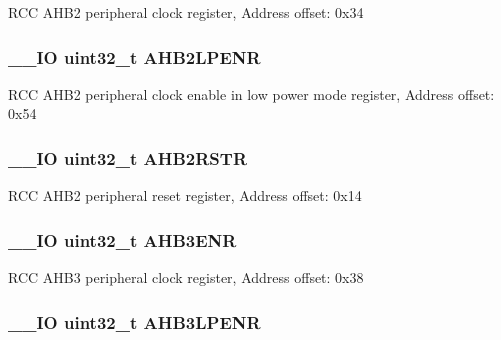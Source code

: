 R\-C\-C A\-H\-B2 peripheral clock register, Address offset\-: 0x34 \hypertarget{struct_r_c_c___type_def_a2b30982547fae7d545d260312771b5c9}{
\subsubsection[{A\-H\-B2\-L\-P\-E\-N\-R}]{\setlength{\rightskip}{0pt plus 5cm}\-\_\-\-\_\-\-I\-O uint32\-\_\-t A\-H\-B2\-L\-P\-E\-N\-R}}\label{struct_r_c_c___type_def_a2b30982547fae7d545d260312771b5c9}
R\-C\-C A\-H\-B2 peripheral clock enable in low power mode register, Address offset\-: 0x54 \hypertarget{struct_r_c_c___type_def_a78a5aa9dd5694c48a7d8e66888a46450}{
\subsubsection[{A\-H\-B2\-R\-S\-T\-R}]{\setlength{\rightskip}{0pt plus 5cm}\-\_\-\-\_\-\-I\-O uint32\-\_\-t A\-H\-B2\-R\-S\-T\-R}}\label{struct_r_c_c___type_def_a78a5aa9dd5694c48a7d8e66888a46450}
R\-C\-C A\-H\-B2 peripheral reset register, Address offset\-: 0x14 \hypertarget{struct_r_c_c___type_def_acdaa650fcd63730825479f6e8f70d4c0}{
\subsubsection[{A\-H\-B3\-E\-N\-R}]{\setlength{\rightskip}{0pt plus 5cm}\-\_\-\-\_\-\-I\-O uint32\-\_\-t A\-H\-B3\-E\-N\-R}}\label{struct_r_c_c___type_def_acdaa650fcd63730825479f6e8f70d4c0}
R\-C\-C A\-H\-B3 peripheral clock register, Address offset\-: 0x38 \hypertarget{struct_r_c_c___type_def_a2ff82b9bf0231645108965aa0febd766}{
\subsubsection[{A\-H\-B3\-L\-P\-E\-N\-R}]{\setlength{\rightskip}{0pt plus 5cm}\-\_\-\-\_\-\-I\-O uint32\-\_\-t A\-H\-B3\-L\-P\-E\-N\-R}}\label{struct_r_c_c___type_def_a2ff82b9bf0231645108965aa0febd766}
